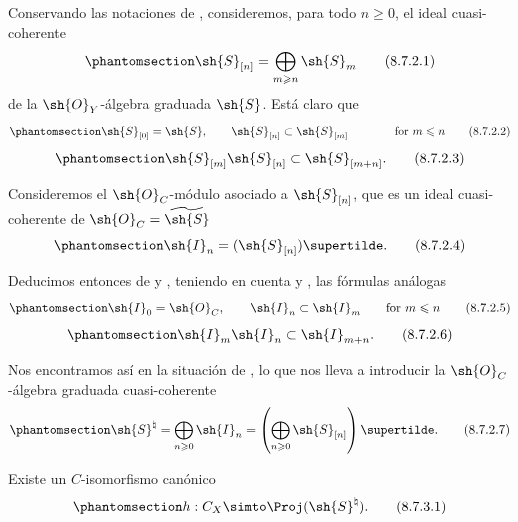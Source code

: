 \documentclass[oneside,10pt]{amsart}
\renewcommand{\leq}{\leqslant}
\renewcommand{\geq}{\geqslant}
\let\EGAOriginalLabel\label
\renewcommand{\label}[1]{\phantomsection\EGAOriginalLabel{#1}}
\begin{document}
\begin{env}[8.7.2]
\label{II.8.7.2}
Conservando las notaciones de , consideremos, para todo $n\geq0$, el ideal cuasi-coherente
\[
\label{II.8.7.2.1}
  \sh{S}_{[n]} = \bigoplus_{m\geq n}\sh{S}_m
\tag{8.7.2.1}
\]
de la $\sh{O}_Y$-álgebra graduada $\sh{S}$.
Está claro que
\[
\label{II.8.7.2.2}
  \sh{S}_{[0]} = \sh{S},
  \qquad
  \sh{S}_{[n]} \subset \sh{S}_{[m]}
  \qquad\qquad
  \mbox{for $m\leq n$}
\tag{8.7.2.2}
\]
\[
\label{II.8.7.2.3}
  \sh{S}_{[m]} \sh{S}_{[n]} \subset \sh{S}_{[m+n]}.
\tag{8.7.2.3}
\]

Consideremos el $\sh{O}_C$-módulo asociado a $\sh{S}_{[n]}$, que es un ideal cuasi-coherente de $\sh{O}_C = \widetilde{\sh{S}}$ 
\[
\label{II.8.7.2.4}
  \sh{I}_n = (\sh{S}_{[n]})\supertilde.
\tag{8.7.2.4}
\]

Deducimos entonces de  y , teniendo en cuenta  y , las fórmulas análogas
\[
\label{II.8.7.2.5}
  \sh{I}_{0} = \sh{O}_C,
  \qquad
  \sh{I}_{n} \subset \sh{I}_{m}
  \qquad
  \text{for }m\leq n
\tag{8.7.2.5}
\]
\[
\label{II.8.7.2.6}
  \sh{I}_{m} \sh{I}_{n} \subset \sh{I}_{m+n}.
\tag{8.7.2.6}
\]

Nos encontramos así en la situación de , lo que nos lleva a introducir la $\sh{O}_C$-álgebra graduada cuasi-coherente
\[
\label{II.8.7.2.7}
  \sh{S}^\natural
  =
  \bigoplus_{n\geq0}\sh{I}_n
  =
  \left(
    \bigoplus_{n\geq0} \sh{S}_{[n]}
  \right)\supertilde.
\tag{8.7.2.7}
\]
\end{env}
\begin{proposition}[8.7.3]
\label{II.8.7.3}
Existe un $C$-isomorfismo canónico
\[
\label{II.8.7.3.1}
  h: C_X \simto \Proj(\sh{S}^\natural).
\tag{8.7.3.1}
\]
\end{proposition}
\end{document}
